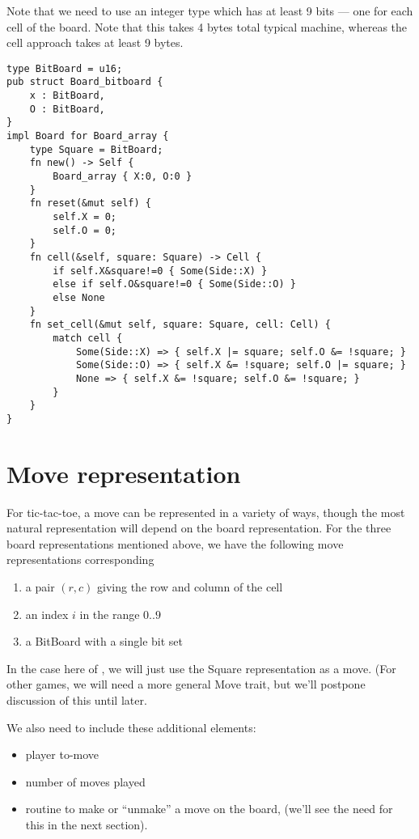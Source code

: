 \documentclass[10pt,dvipdfmx]{report}
\newcommand{\g}[1]{{\sc{#1}}\index{{\sc{#1}}}}
\begin{document}
Note that we need to use an integer type which has at least 9 bits --- one for each cell
of the board.  Note that this takes 4 bytes total typical machine, whereas the cell approach
takes at least 9 bytes.
{\scriptsize
\begin{verbatim}
type BitBoard = u16;
pub struct Board_bitboard {
    x : BitBoard,
    O : BitBoard,
}
impl Board for Board_array {
    type Square = BitBoard;
    fn new() -> Self {
        Board_array { X:0, O:0 }
    }
    fn reset(&mut self) {
        self.X = 0;
        self.O = 0;
    }
    fn cell(&self, square: Square) -> Cell {
        if self.X&square!=0 { Some(Side::X) }
        else if self.O&square!=0 { Some(Side::O) }
        else None
    }
    fn set_cell(&mut self, square: Square, cell: Cell) {
        match cell {
            Some(Side::X) => { self.X |= square; self.O &= !square; }
            Some(Side::O) => { self.X &= !square; self.O |= square; }
            None => { self.X &= !square; self.O &= !square; }
        }
    }
}
\end{verbatim}
}

\section{Move representation}
For tic-tac-toe, a move can be represented in a variety of ways, though the most
natural representation will depend on the board representation.  For the three board representations
mentioned above, we have the following move representations corresponding
\begin{enumerate}
\item a pair $(r,c)$ giving the row and column of the cell
\item an index $i$ in the range $0..9$
\item a BitBoard with a single bit set
\end{enumerate}

In the case here of \g{tic-tac-toe}, we will just use the Square representation as a move.  (For other games,
we will need a more general Move trait, but we'll postpone discussion of this until later.

We also need to include these additional elements:
\begin{itemize}
\item player to-move
\item number of moves played
\item routine to make or ``unmake'' a move on the board, (we'll see the need for this in the next section).
\end{itemize}
\end{document}
